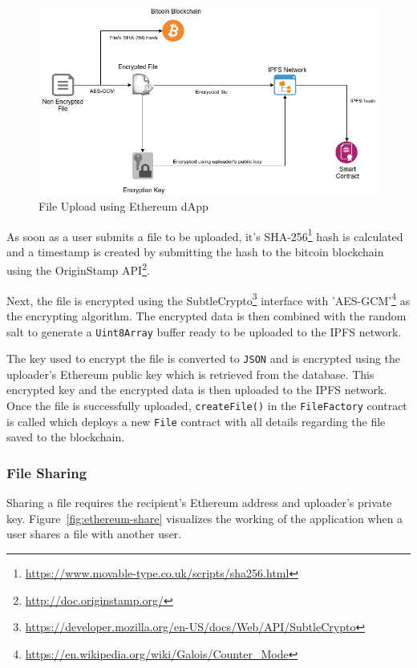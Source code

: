 				\begin{figure}[h]
					\includegraphics[width=\linewidth]{figures/ethereum-upload}
					\caption{\label{fig:ethereum-upload} File Upload using Ethereum dApp}
				\end{figure}
				
				As soon as a user submits a file to be uploaded, it's SHA-256\footnote{\url{https://www.movable-type.co.uk/scripts/sha256.html}} hash is calculated and a timestamp is created by submitting the hash to the bitcoin blockchain using the OriginStamp API\footnote{\url{http://doc.originstamp.org/}}.
				
				Next, the file is encrypted using the SubtleCrypto\footnote{\url{https://developer.mozilla.org/en-US/docs/Web/API/SubtleCrypto}} interface with 'AES-GCM'\footnote{\url{https://en.wikipedia.org/wiki/Galois/Counter_Mode}} as the encrypting algorithm. The encrypted data is then combined with the random salt to generate a \texttt{Uint8Array} buffer ready to be uploaded to the IPFS network.
				
				The key used to encrypt the file is converted to \texttt{JSON} and is encrypted using the uploader's Ethereum public key which is retrieved from the database. This encrypted key and the encrypted data is then uploaded to the IPFS network. Once the file is successfully uploaded, \texttt{createFile()} in the \texttt{FileFactory} contract is called which deploys a new \texttt{File} contract with all details regarding the file saved to the blockchain.
			
			\subsubsection{File Sharing}
				Sharing a file requires the recipient's Ethereum address and uploader's private key. Figure~\ref{fig:ethereum-share} visualizes the working of the application when a user shares a file with another user.
				
